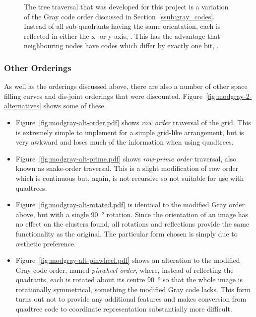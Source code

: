 \begin{figure}[tbh]
	\caption[Modified Gray Code ordering]{The tree traversal that was developed
		for this project is a variation of the Gray code order discussed in
		Section~\ref{ssub:gray_codes}.  Instead of all sub-quadrants having the
		same orientation, each is reflected in either the x- or y-axis,
		. This has the advantage that
		neighbouring nodes have codes which differ by exactly one bit,
		.}\label{fig:modgray-traversal}
\end{figure}


\subsubsection{Other Orderings}
\label{ssub:other_orderings}

As well as the orderings discussed above, there are also a number of other
space filling curves and dis-joint orderings that were discounted.
Figure~\ref{fig:modgray-2-alternatives} shows some of these.

\begin{itemize}

	\item Figure~\ref{fig:modgray-alt-order.pdf} shows \emph{row order}
		traversal of the grid. This is extremely simple to implement for a
		simple grid-like arrangement, but is very awkward and loses much of the
		information when using quadtrees.

	\item Figure~\ref{fig:modgray-alt-prime.pdf} shows \emph{row-prime order}
		traversal, also known as snake-order \cite{goodchild1983optimizing}
		traversal.  This is a slight modification of row order which is
		continuous but, again, is not recursive so not suitable for use with
		quadtrees.

	\item Figure~\ref{fig:modgray-alt-rotated.pdf} is identical to the
		modified Gray order above, but with a single \SI{90}{\degree} rotation.
		Since the orientation of an image has no effect on the clusters found,
		all rotations and reflections provide the same functionality as the
		original. The particular form chosen is simply due to {\ae}sthetic
		preference.

	\item Figure~\ref{fig:modgray-alt-pinwheel.pdf} shows an alteration to the
		modified Gray code order, named \emph{pinwheel order}, where, instead
		of reflecting the quadrants, each is rotated about its centre
		\SI{90}{\degree} so that the whole image is rotationally symmetrical,
		something the modified Gray code lacks.  This form turns out not to
		provide any additional features and makes conversion from quadtree code
		to coordinate representation substantially more difficult.

\end{itemize}

